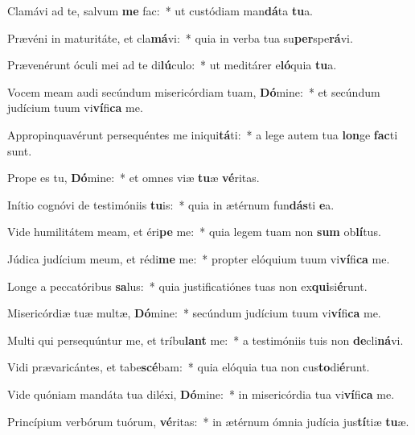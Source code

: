 \item Clamávi ad te, salvum \textbf{me} fac:~* ut custódiam man\textbf{dá}ta \textbf{tu}a.
\item Prævéni in maturitáte, et cla\textbf{má}vi:~* quia in verba tua su\textbf{per}spe\textbf{rá}vi.
\item Prævenérunt óculi mei ad te di\textbf{lú}culo:~* ut meditárer e\textbf{ló}quia \textbf{tu}a.
\item Vocem meam audi secúndum misericórdiam tuam, \textbf{Dó}mine:~* et secúndum judícium tuum vi\textbf{ví}fi\textbf{ca} me.
\item Appropinquavérunt persequéntes me iniqui\textbf{tá}ti:~* a lege autem tua \textbf{lon}ge \textbf{fac}ti sunt.
\item Prope es tu, \textbf{Dó}mine:~* et omnes viæ \textbf{tu}æ \textbf{vé}ritas.
\item Inítio cognóvi de testimóniis \textbf{tu}is:~* quia in ætérnum fun\textbf{dás}ti \textbf{e}a.
\item Vide humilitátem meam, et éri\textbf{pe} me:~* quia legem tuam non \textbf{sum} ob\textbf{lí}tus.
\item Júdica judícium meum, et rédi\textbf{me} me:~* propter elóquium tuum vi\textbf{ví}fi\textbf{ca} me.
\item Longe a peccatóribus \textbf{sa}lus:~* quia justificatiónes tuas non ex\textbf{qui}si\textbf{é}runt.
\item Misericórdiæ tuæ multæ, \textbf{Dó}mine:~* secúndum judícium tuum vi\textbf{ví}fi\textbf{ca} me.
\item Multi qui persequúntur me, et tríbu\textbf{lant} me:~* a testimóniis tuis non \textbf{de}cli\textbf{ná}vi.
\item Vidi prævaricántes, et tabe\textbf{scé}bam:~* quia elóquia tua non cus\textbf{to}di\textbf{é}runt.
\item Vide quóniam mandáta tua diléxi, \textbf{Dó}mine:~* in misericórdia tua vi\textbf{ví}fi\textbf{ca} me.
\item Princípium verbórum tuórum, \textbf{vé}ritas:~* in ætérnum ómnia judícia jus\textbf{tí}tiæ \textbf{tu}æ.
